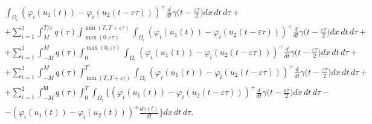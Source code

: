 \begin{pf}
\begin{multline}
\int_{\Omega_{i}}({\varphi_{i}(u_{1}(t))-\varphi_{i}(u_{2}


(t-\varepsilon \tau))})^{+}


\frac{d}{dt}\gamma\bigg(t-\frac{\varepsilon \tau}{2}\bigg)dx\,dt\,d\tau+\\


%


+\sum_{i=1}^{2} \int_{ M}^{T / \varepsilon} q(\tau)


\int_{\max (0, \varepsilon \tau)}^{\min (T, T+\varepsilon \tau)}


\int_{\Omega_{i}} 


({\varphi_{i}(u_{1}(t))-\varphi_{i}(u_{2}(t-\varepsilon \tau))})^{+}


\frac{d}{dt}\gamma\bigg(t-\frac{\varepsilon \tau}{2}\bigg)dx\,dt\,d\tau+\\


%


+\sum_{i=1}^{2} \int_{ -M}^{M} q(\tau)


\int_{0}^{\max (0, \varepsilon \tau)} \int_{\Omega_{i}} 


({\varphi_{i}(u_{1}(t))-\varphi_{i}(u_{2}(t-\varepsilon \tau))})^{+}


\frac{d}{dt}\gamma\bigg(t-\frac{\varepsilon\tau}{2}\bigg)dx\,dt\,d \tau+\\


%


+\sum_{i=1}^{2} \int_{- M}^{M} q(\tau)


\int_{\min (T, T+\varepsilon \tau)}^{T} \int_{\Omega_{i}} 


({\varphi_{i}(u_{1}(t))-\varphi_{i}(u_{2}(t-\varepsilon \tau))})^{+}


\frac{d}{dt}\gamma\bigg(t-\frac{\varepsilon\tau}{2}\bigg)dx\,dt\,d\tau+\\


%


+\sum_{i=1}^{2} \int_{-M}^{М} q(\tau)


\int_{0}^{T} \int_{\Omega_{i}} 


\bigg\{ (\varphi_{i}(u_{1}(t))-\varphi_{i}(u_{2}(t-\varepsilon \tau)))^{+}


\frac{d}{dt}\gamma\bigg(t-\frac{\varepsilon \tau}{2}\bigg)dx\,dt\,d\tau -\\


%


-(\varphi_{i}(u_{1}(t))-\varphi_{i}(u_{2}(t)))^{+}


\frac{d \gamma(t)}{dt}\bigg \} dx\, dt\, d \tau.


\end{multline}



\end{pf}
